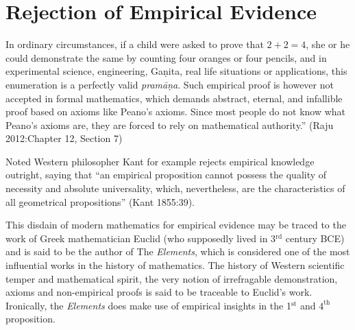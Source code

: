 \section*{Rejection of Empirical Evidence}

In ordinary circumstances, if a child were asked to prove that $2 + 2 = 4$, she or he could demonstrate the same by counting four oranges or four pencils, and in experimental science, engineering, Gaṇita, real life situations or applications, this enumeration is a perfectly valid {\sl pramāṇa}. Such empirical proof is however not accepted in formal mathematics, which demands abstract, eternal, and infallible proof based on axioms like Peano’s axioms. Since most people do not know what Peano’s axioms are, they are forced to rely on mathematical authority.''
\hfill (Raju 2012:Chapter 12, Section 7)

Noted Western philosopher Kant for example rejects empirical knowledge outright, saying that ``an empirical proposition cannot possess the quality of necessity and absolute universality, which, nevertheless, are the characteristics of all geometrical propositions'' (Kant 1855:39). 

This disdain of modern mathematics for empirical evidence may be traced to the work of Greek mathematician Euclid (who supposedly lived in 3$^{\text{rd}}$ century BCE) and is said to be the author of The {\sl Elements}, which is considered one of the most influential works in the history of mathematics. The history of Western scientific temper and mathematical spirit, the very notion of irrefragable demonstration, axioms and non-empirical proofs is said to be traceable to Euclid’s work. Ironically, the {\sl Elements} does make use of empirical insights in the  1$^{\text{st}}$ and $4^{\text{th}}$ proposition.

